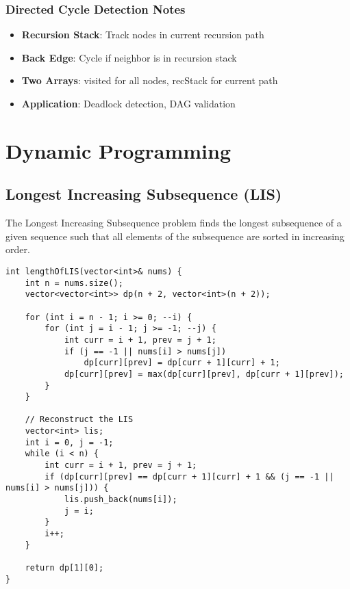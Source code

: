 \documentclass[11pt,a4paper]{article}
\begin{document}
\subsubsection*{Directed Cycle Detection Notes}
\begin{itemize}
\item \textbf{Recursion Stack}: Track nodes in current recursion path
\item \textbf{Back Edge}: Cycle if neighbor is in recursion stack
\item \textbf{Two Arrays}: visited for all nodes, recStack for current path
\item \textbf{Application}: Deadlock detection, DAG validation
\end{itemize}

\newpage

\section{Dynamic Programming}

\subsection{Longest Increasing Subsequence (LIS)}
The Longest Increasing Subsequence problem finds the longest subsequence of a given sequence such that all elements of the subsequence are sorted in increasing order.

\begin{lstlisting}[caption={LIS - 2D DP Bottom-Up Implementation}]
int lengthOfLIS(vector<int>& nums) {
    int n = nums.size();
    vector<vector<int>> dp(n + 2, vector<int>(n + 2));

    for (int i = n - 1; i >= 0; --i) {
        for (int j = i - 1; j >= -1; --j) {
            int curr = i + 1, prev = j + 1;
            if (j == -1 || nums[i] > nums[j])
                dp[curr][prev] = dp[curr + 1][curr] + 1;
            dp[curr][prev] = max(dp[curr][prev], dp[curr + 1][prev]);
        }
    }

    // Reconstruct the LIS
    vector<int> lis;
    int i = 0, j = -1;
    while (i < n) {
        int curr = i + 1, prev = j + 1;
        if (dp[curr][prev] == dp[curr + 1][curr] + 1 && (j == -1 || nums[i] > nums[j])) {
            lis.push_back(nums[i]);
            j = i;
        }
        i++;
    }

    return dp[1][0];
}
\end{lstlisting}
\end{document}
